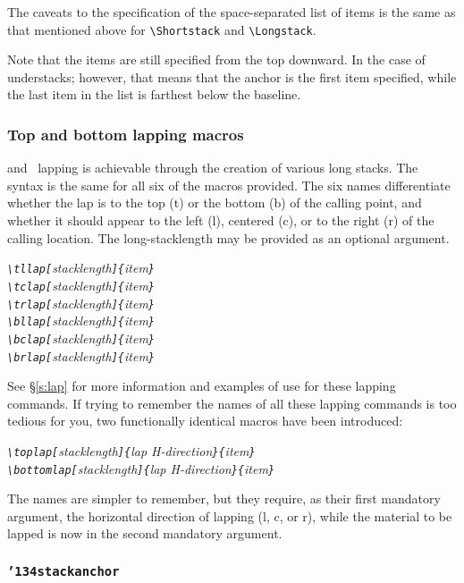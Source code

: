 \documentclass{article}
\let\vb\verb
\newcommand\cmd[1]{\texttt{\char'134#1}}
\begin{document}
The caveats to the specification of the space-separated list of items is
the same as that mentioned above for \vb|\Shortstack| and
\vb|\Longstack|.

Note that the items are still specified from the top downward.
In the case of understacks; however, that means that the anchor is the
first item specified, while the last item in the list is farthest below
the baseline.

\subsubsection{Top and bottom lapping macros\label{s:lapdef}}

and ~lapping is achievable through the creation of various
long stacks.  The syntax is the same for all six of the macros provided.
The six names differentiate whether the lap is to the top (t) or the
bottom (b) of the calling point, and whether it should appear to the
left (l), centered (c), or to the right (r) of the calling location.
The long-stacklength may be provided as an optional argument.

\itshape
\vb|\tllap[|stacklength\vb|]{|item\vb|}|\\
\vb|\tclap[|stacklength\vb|]{|item\vb|}|\\
\vb|\trlap[|stacklength\vb|]{|item\vb|}|\\
\vb|\bllap[|stacklength\vb|]{|item\vb|}|\\
\vb|\bclap[|stacklength\vb|]{|item\vb|}|\\
\vb|\brlap[|stacklength\vb|]{|item\vb|}|
\upshape

See \S\ref{s:lap} for more information and examples of use for
these lapping commands.  If trying to remember the names of all these
lapping commands is too tedious for you, two functionally identical
macros have been introduced:

\itshape
\vb|\toplap[|stacklength\vb|]{|lap H-direction\vb|}{|item\vb|}|\\
\vb|\bottomlap[|stacklength\vb|]{|lap H-direction\vb|}{|item\vb|}|
\upshape

The names are simpler to remember, but they require, as their first
mandatory argument, the horizontal direction of lapping (l, c, or r),
while the material to be lapped is now in the second mandatory argument.
\vspace{-0.8ex}

\subsubsection{\cmd{stackanchor}\label{s:sanc}}
\end{document}
